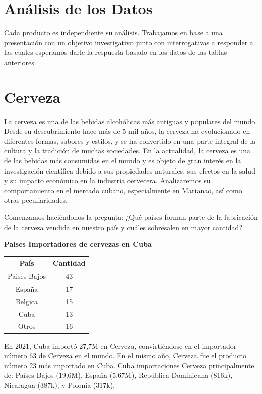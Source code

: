 \documentclass[a4paper,12pt]{article}
\begin{document}
\section{Análisis de los Datos}
Cada producto es independiente su análisis. 
Trabajamos en base a una presentación con un objetivo investigativo junto con interrogativas a responder a las cuales esperamos darle la respuesta basado en los datos de las tablas anteriores.
\section{Cerveza}
La cerveza es una de las bebidas alcohólicas más antiguas y populares del mundo. Desde su descubrimiento hace más de 5 mil años, la cerveza ha evolucionado en diferentes formas, sabores y estilos, y se ha convertido en una parte integral de la cultura y la tradición de muchas sociedades. 
En la actualidad, la cerveza es una de las bebidas más consumidas en el mundo y es objeto de gran interés en la investigación científica debido a sus propiedades naturales, sus efectos en la salud y su impacto económico en la industria cervecera. 
Analizaremos su comportamiento en el mercado cubano, especialmente en Marianao, así como otras peculiaridades.

Comenzamos haciéndonos la pregunta: ¿Qué países forman parte de la fabricación de la cerveza vendida en nuestro país y cuáles sobresalen en mayor cantidad?
\begin{center}
    \textbf{Paises Importadores de cervezas en Cuba}
    \begin{tabular}{|c|c|}
        \hline
        País & Cantidad\\
        \hline
        Paises Bajos & 43\\
        \hline
        España & 17\\
        \hline
        Belgica & 15\\
        \hline
        Cuba & 13\\
        \hline
        Otros & 16\\
        \hline
        
    \end{tabular}
\end{center}
En 2021, Cuba importó 27,7M en Cerveza, convirtiéndose en el importador número 63 de Cerveza en el mundo. 
En el mismo año, Cerveza fue el producto número 23 más importado en Cuba. 
Cuba importaciones Cerveza principalmente de: Países Bajos (19,6M), España (5,67M), República Dominicana (816k), Nicaragua (387k), y Polonia (317k).
\end{document}
